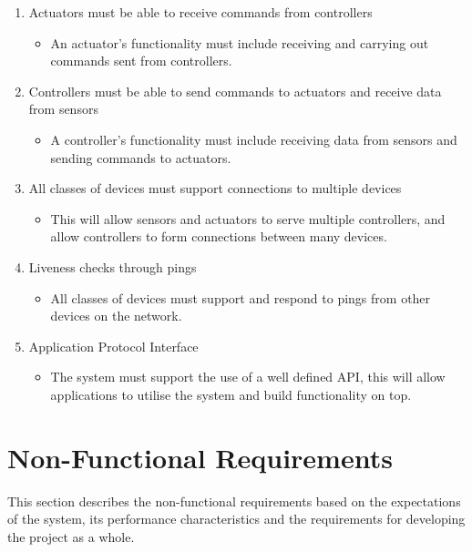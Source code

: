 \begin{enumerate}
\begin{itemize}
	\end{itemize}
	\item Actuators must be able to receive commands from controllers
	\begin{itemize}
		\item An actuator's functionality must include receiving and carrying out commands sent from controllers.
	\end{itemize}
	\item Controllers must be able to send commands to actuators and receive data from sensors
	\begin{itemize}
		\item A controller's functionality must include receiving data from sensors and sending commands to actuators. 
	\end{itemize}
	\item All classes of devices must support connections to multiple devices 
	\begin{itemize}
		\item This will allow sensors and actuators to serve multiple controllers, and allow controllers to form connections between many devices.
	\end{itemize}
	\item Liveness checks through pings
	\begin{itemize}
		\item All classes of devices must support and respond to pings from other devices on the network.
	\end{itemize}
	\item Application Protocol Interface
	\begin{itemize}
		\item The system must support the use of a well defined API, this will allow applications to utilise the system and build functionality on top.
	\end{itemize}
\end{enumerate}

\section{Non-Functional Requirements} %
\label{sec:non_functional_requirements}
This section describes the non-functional requirements based on the expectations of the system, its performance characteristics and the requirements for developing the project as a whole.
